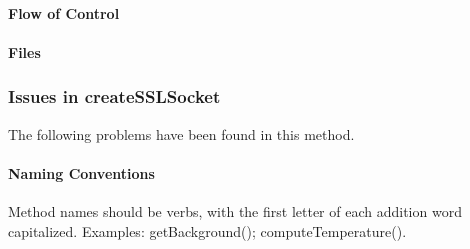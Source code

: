 \paragraph{Flow of Control}
\begin{itemize}
\end{itemize}

\paragraph{Files}
\begin{itemize}
\end{itemize}

\subsubsection{Issues in createSSLSocket}
The following problems have been found in this method.

\paragraph{Naming Conventions}
\begin{itemize}
	Method names should be verbs, with the first letter of each addition word capitalized. Examples: getBackground(); computeTemperature().
\end{itemize}

